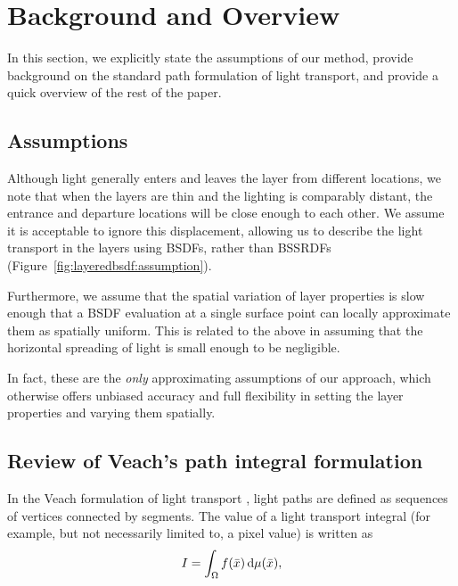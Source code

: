 \section{Background and Overview}
\label{sec:layeredbsdf:background}

In this section, we explicitly state the assumptions of our method, provide background on the standard path formulation of light transport, and provide a quick overview of the rest of the paper.

\subsection{Assumptions}
Although light generally enters and leaves the layer from different locations, we note that when the layers are thin and the lighting is comparably distant, the entrance and departure locations will be close enough to each other. We assume it is acceptable to ignore this displacement, allowing us to describe the light transport in the layers using BSDFs, rather than BSSRDFs (Figure~\ref{fig:layeredbsdf:assumption}).



Furthermore, we assume that the spatial variation of layer properties is slow enough that a BSDF evaluation at a single surface point can locally approximate them as spatially uniform. This is related to the above in assuming that the horizontal spreading of light is small enough to be negligible.

In fact, these are the \emph{only} approximating assumptions of our approach, which otherwise offers unbiased accuracy and full flexibility in setting the layer properties and varying them spatially.

\subsection{Review of Veach's path integral formulation}
\label{subsec:path_int}

In the Veach formulation of light transport \cite{veach1997robust}, light paths are defined as sequences of vertices connected by segments.
The value of a light transport integral (for example, but not necessarily limited to, a pixel value) is written as
\begin{equation}
	I = \int_\Omega f(\bar x) \,\mathrm{d} \mu(\bar x),
\end{equation}

